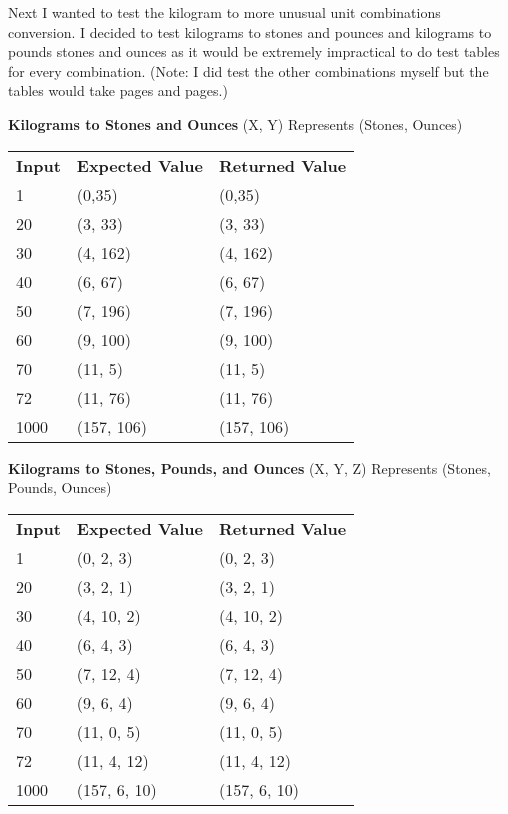 \documentclass[a4paper]{article}
\begin{document}
Next I wanted to test the kilogram to more unusual unit combinations conversion. I decided to test kilograms to stones and pounces and kilograms to pounds stones and ounces as it would be extremely impractical to do test tables for every combination. (Note: I did test the other combinations myself but the tables would take pages and pages.)

\noindent \textbf{Kilograms to Stones and Ounces}
\noindent (X, Y) Represents (Stones, Ounces)
\begin{table}[H]
\begin{tabular}{lll}
\textbf{Input} & \textbf{Expected Value} & \textbf{Returned Value} \\
1              & (0,35)                  & (0,35)                  \\
20             & (3, 33)                 & (3, 33)                 \\
30             & (4, 162)                & (4, 162)                \\
40             & (6, 67)                 & (6, 67)                 \\
50             & (7, 196)                & (7, 196)                \\
60             & (9, 100)                & (9, 100)                \\
70             & (11, 5)                 & (11, 5)                 \\
72             & (11, 76)                & (11, 76)                \\
1000           & (157, 106)              & (157, 106)             
\end{tabular}
\end{table}

\noindent \textbf{Kilograms to Stones, Pounds, and Ounces}
\noindent (X, Y, Z) Represents (Stones, Pounds, Ounces)
\begin{table}[H]
\begin{tabular}{lll}
\textbf{Input} & \textbf{Expected Value} & \textbf{Returned Value} \\
1              & (0, 2, 3)               & (0, 2, 3)               \\
20             & (3, 2, 1)               & (3, 2, 1)               \\
30             & (4, 10, 2)              & (4, 10, 2)              \\
40             & (6, 4, 3)               & (6, 4, 3)               \\
50             & (7, 12, 4)              & (7, 12, 4)              \\
60             & (9, 6, 4)               & (9, 6, 4)               \\
70             & (11, 0, 5)              & (11, 0, 5)              \\
72             & (11, 4, 12)             & (11, 4, 12)             \\
1000           & (157, 6, 10)            & (157, 6, 10)           
\end{tabular}
\end{table} 
\end{document}
